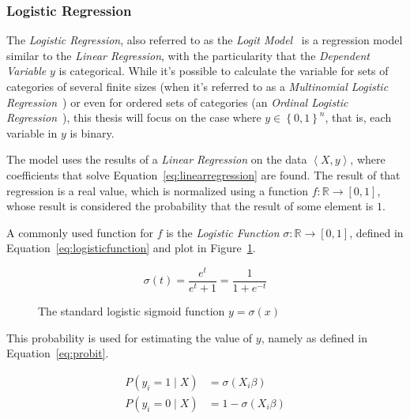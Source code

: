 \subsubsection{Logistic Regression}
\label{subsec:logisticregression}

The \emph{Logistic Regression}, also referred to as the \emph{Logit Model}~\cite{freedman2009statistical} is a regression model similar to the \emph{Linear Regression}, with the particularity that the \emph{Dependent Variable} $y$ is categorical. While it's possible to calculate the variable for sets of categories of several finite sizes (when it's referred to as a \emph{Multinomial Logistic Regression}~\cite{greene_econometric_2011}) or even for ordered sets of categories (an \emph{Ordinal Logistic Regression}~\cite{mccullagh1980ordinal}), this thesis will focus on the case where $y \in {\left\{ 0, 1 \right\}}^n$, that is, each variable in $y$ is binary.

The model uses the results of a \emph{Linear Regression} on the data $\left< X, y \right>$, where coefficients that solve Equation~\ref{eq:linearregression} are found. The result of that regression is a real value, which is normalized using a function $f : \mathbb{R} \rightarrow \left[ 0, 1 \right]$, whose result is considered the probability that the result of some element is $1$.

A commonly used function for $f$ is the \emph{Logistic Function} $\sigma : \mathbb{R} \rightarrow \left[ 0, 1 \right]$, defined in Equation~\ref{eq:logisticfunction} and plot in Figure~\ref{fig:logistic}.

\begin{equation}
\label{eq:logisticfunction}
\sigma \left( t \right) = \frac{e^t}{e^t + 1} = \frac{1}{1 + e^{-t}}
\end{equation}

\begin{figure}
\centering
{}
\caption{The standard logistic sigmoid function $y = \sigma(x)$}
\label{fig:logistic}
\end{figure}

This probability is used for estimating the value of $y$, namely as defined in Equation~\ref{eq:probit}.

\begin{equation}
\label{eq:probit}
\begin{aligned}
	P \left( y_i = 1 \mid X \right) &= \sigma \left( X_i \beta \right) \\
	P \left( y_i = 0 \mid X \right) &= 1 - \sigma \left( X_i \beta \right)
\end{aligned}
\end{equation}

